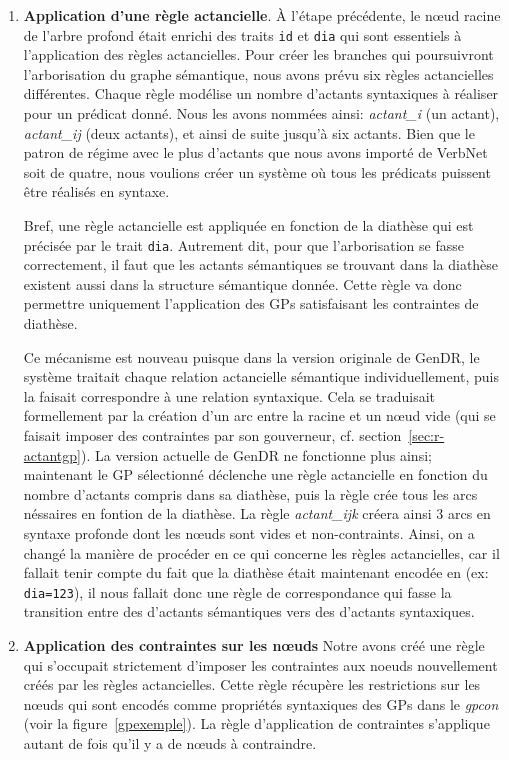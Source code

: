 \begin{enumerate}
	\item \textbf{Application d'une règle actancielle}.
	À l'étape précédente, le n\oe{}ud racine de l'arbre profond était enrichi des traits \texttt{id} et \texttt{dia} qui sont essentiels à l'application des règles actancielles. Pour créer les branches qui poursuivront l'arborisation du graphe sémantique, nous avons prévu six règles actancielles différentes. Chaque règle modélise un nombre d'actants syntaxiques à réaliser pour un prédicat donné. Nous les avons nommées ainsi: \emph{actant\_i} (un actant), \emph{actant\_ij} (deux actants), et ainsi de suite jusqu'à six actants. Bien que le patron de régime avec le plus d'actants que nous avons importé de VerbNet soit de quatre, nous voulions créer un système où tous les prédicats puissent être réalisés en syntaxe. 
	
	Bref, une règle actancielle est appliquée en fonction de la diathèse qui est précisée par le trait \texttt{dia}. Autrement dit, pour que l'arborisation se fasse correctement, il faut que les actants sémantiques se trouvant dans la diathèse existent aussi dans la structure sémantique donnée. Cette règle va donc permettre uniquement l'application des \acp{GP} satisfaisant les contraintes de diathèse.
	
	Ce mécanisme est nouveau puisque dans la version originale de GenDR, le système traitait chaque relation actancielle sémantique individuellement, puis la faisait correspondre à une relation syntaxique. Cela se traduisait formellement par la création d'un arc entre la racine et un n\oe{}ud vide (qui se faisait imposer des contraintes par son gouverneur, cf. section~\ref{sec:r-actantgp}). La version actuelle de GenDR ne fonctionne plus ainsi; maintenant le \ac{GP} sélectionné déclenche une règle actancielle en fonction du nombre d'actants compris dans sa diathèse, puis la règle crée tous les arcs néssaires en fontion de la diathèse. La règle \emph{actant\_ijk} créera ainsi 3 arcs en syntaxe profonde dont les n\oe{}uds sont vides et non-contraints. Ainsi, on a changé la manière de procéder en ce qui concerne les règles actancielles, car il fallait tenir compte du fait que la diathèse était maintenant encodée en  (ex: \texttt{dia=123}), il nous fallait donc une règle de correspondance qui fasse la transition entre des  d'actants sémantiques vers des  d'actants syntaxiques.
	
	\item \textbf{Application des contraintes sur les n\oe{}uds}
Notre avons créé une règle qui s'occupait strictement d'imposer les contraintes aux noeuds nouvellement créés par les règles actancielles. Cette règle récupère les restrictions sur les n\oe{}uds qui sont encodés comme propriétés syntaxiques des \acp{GP} dans le \emph{gpcon} (voir la figure~\ref{gpexemple}). La règle d'application de contraintes s'applique autant de fois qu'il y a de n\oe{}uds à contraindre.


\end{enumerate}
